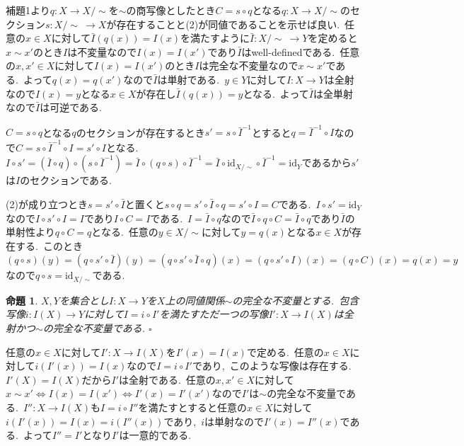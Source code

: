 \documentclass[uplatex,dvipdfmx]{jsarticle}
\makeatletter
\theoremstyle{noperiod}
\newtheorem{proposition}{命題}
\renewenvironment{proof}[1][\proofname]{\par
  \pushQED{\qed}
  \normalfont \topsep6\p@\@plus6\p@\relax
  \trivlist
  \item[\hskip\labelsep
        \itshape
    #1 ]\ignorespaces
}{
  \popQED\endtrivlist\@endpefalse
}
\renewcommand{\proofname}{\bfseries 証明}
\makeatother
\begin{document}
\begin{proof}
補題1より$q \colon X \to X/\sim$を$\sim$の商写像としたとき$C = s \circ q$となる$q \colon X \to X/\sim$のセクション$s \colon X/\sim\ \to X$が存在することと(2)が同値であることを示せば良い.\ 任意の$x \in X$に対して$\bar{I}(q(x)) = I(x)$を満たすように$\bar{I} \colon X/\sim \ \to Y$を定めると$x \sim x'$のとき$I$は不変量なので$I(x) = I(x')$であり$\bar{I}$はwell-definedである.\ 任意の$x, x' \in X$に対して$I(x) = I(x')$のとき$I$は完全な不変量なので$x \sim x'$である.\ よって$q(x) = q(x')$なので$\bar{I}$は単射である.\ $y \in Y$に対して$I \colon X \to Y$は全射なので$I(x) = y$となる$x \in X$が存在し$\bar{I}(q(x)) = y$となる.\ よって$\bar{I}$は全単射なので$\bar{I}$は可逆である.

$C = s \circ q$となる$q$のセクションが存在するとき$s' = s \circ \bar{I}^{-1}$とすると$q = \bar{I}^{-1} \circ I$なので$C = s \circ \bar{I}^{-1} \circ I = s' \circ I$となる.\ $I \circ s' = (\bar{I} \circ q) \circ (s \circ \bar{I}^{-1}) = \bar{I} \circ (q \circ s) \circ \bar{I}^{-1} = \bar{I} \circ \mathrm{id}_{X/\sim} \circ \bar{I}^{-1} = \mathrm{id}_Y$であるから$s'$は$I$のセクションである.

(2)が成り立つとき$s = s' \circ \bar{I}$と置くと$s \circ q = s' \circ \bar{I} \circ q = s' \circ I = C$である.\ $I \circ s' = \mathrm{id}_Y$なので$I \circ s' \circ I = I$であり$I \circ C = I$である.\ $I = \bar{I} \circ q$なので$\bar{I} \circ q \circ C = \bar{I} \circ q$であり$\bar{I}$の単射性より$q \circ C = q$となる.\ 任意の$y \in X/\sim$に対して$y = q(x)$となる$x \in X$が存在する.\ このとき$(q \circ s)(y) = (q \circ s' \circ \bar{I})(y) = (q \circ s' \circ \bar{I} \circ q)(x) = (q \circ s' \circ I)(x) = (q \circ C)(x) = q(x) = y$なので$q \circ s = \mathrm{id}_{X/\sim}$である.
\end{proof}

\begin{proposition}
$X,Y$を集合とし$I \colon X \to Y$を$X$上の同値関係$\sim$の完全な不変量とする.\ 包含写像$i \colon I(X) \to Y$に対して$I = i \circ I'$を満たすただ一つの写像$I' \colon X \to I(X)$は全射かつ$\sim$の完全な不変量である.
\hfill $\square$
\end{proposition}

\begin{proof}
任意の$x \in X$に対して$I' \colon X \to I(X)$を$I'(x) = I(x)$で定める.\ 任意の$x \in X$に対して$i(I'(x)) = I(x)$なので$I = i \circ I'$であり,\ このような写像は存在する.\ $I'(X) = I(X)$だから$I'$は全射である.\ 任意の$x, x' \in X$に対して$x \sim x' \iff I(x) = I(x') \iff I'(x) = I'(x')$なので$I'$は$\sim$の完全な不変量である.\ $I'' \colon X \to I(X)$も$I = i \circ I''$を満たすとすると任意の$x \in X$に対して$i(I'(x)) = I(x) = i(I''(x))$であり,\ $i$は単射なので$I'(x) = I''(x)$である.\ よって$I'' = I'$となり$I'$は一意的である.
\end{proof}
\end{document}
